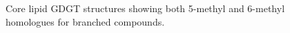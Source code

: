 
\begin{figure}[h!]
	\caption[Core lipid GDGT structures]{Core lipid GDGT structures showing both 5-methyl and 6-methyl homologues for branched compounds.}
	\label{Ch5Fig:S1} 
\end{figure}

\renewcommand\thefigure{\thechapter.\arabic{figure}}
